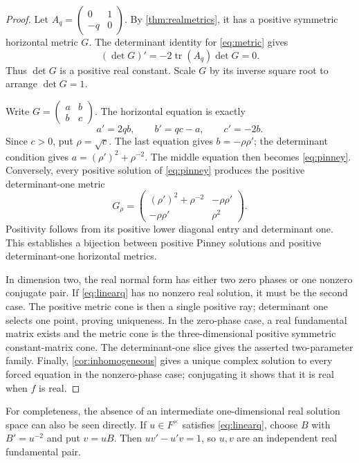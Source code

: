 \documentclass[11pt,a4paper]{article}
\numberwithin{equation}{section}
\theoremstyle{definition}
\theoremstyle{remark}
\newcommand{\tr}{\operatorname{tr}}
\begin{document}
\begin{proof}
Let $A_q=\left(\begin{smallmatrix}0&1\\-q&0\end{smallmatrix}\right)$.
By \cref{thm:realmetrics}, it has a positive symmetric horizontal metric
$G$. The determinant identity for \eqref{eq:metric} gives
\[
 (\det G)'=-2\tr(A_q)\det G=0.
\]
Thus $\det G$ is a positive real constant. Scale $G$ by its inverse square
root to arrange $\det G=1$.

Write $G=\left(\begin{smallmatrix}a&b\\b&c\end{smallmatrix}\right)$.
The horizontal equation is exactly
\begin{equation}\label{eq:metric-components}
 a'=2qb,\qquad b'=qc-a,\qquad c'=-2b.
\end{equation}
Since $c>0$, put $\rho=\sqrt c$. The last equation gives $b=-\rho\rho'$;
the determinant condition gives $a=(\rho')^2+\rho^{-2}$. The middle
equation then becomes \eqref{eq:pinney}. Conversely, every positive
solution of \eqref{eq:pinney} produces the positive determinant-one metric
\begin{equation}\label{eq:PinneyMetric}
 G_\rho=
 \begin{pmatrix}
 (\rho')^2+\rho^{-2}&-\rho\rho'\\
 -\rho\rho'&\rho^2
 \end{pmatrix}.
\end{equation}
Positivity follows from its positive lower diagonal entry and determinant
one. This establishes a bijection between positive Pinney solutions and
positive determinant-one horizontal metrics.

In dimension two, the real normal form has either two zero phases or one
nonzero conjugate pair. If \eqref{eq:linearq} has no nonzero real solution,
it must be the second case. The positive metric cone is then a single
positive ray; determinant one selects one point, proving uniqueness.
In the zero-phase case, a real fundamental matrix exists and the metric
cone is the three-dimensional positive symmetric constant-matrix cone.
The determinant-one slice gives the asserted two-parameter family.
Finally, \cref{cor:inhomogeneous} gives a unique complex solution to every
forced equation in the nonzero-phase case; conjugating it shows that it is
real when $f$ is real.
\end{proof}

For completeness, the absence of an intermediate one-dimensional real
solution space can also be seen directly. If $u\in F^\times$ satisfies
\eqref{eq:linearq}, choose $B$ with $B'=u^{-2}$ and put $v=uB$. Then
$uv'-u'v=1$, so $u,v$ are an independent real fundamental pair.
\end{document}

